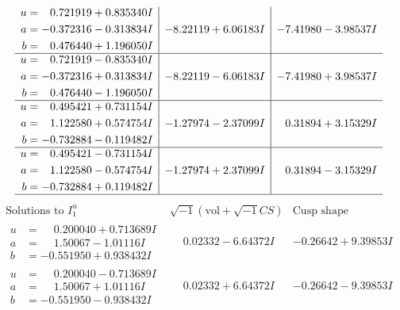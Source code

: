 \documentclass[1p]{elsarticle_modified}
\theoremstyle{definition}
\newcommand{\I}{\sqrt{-1}}
\begin{document}
$$\begin{array}{c|c|c}
\begin{aligned}
u &= \phantom{-}0.721919 + 0.835340 I \\
a &= -0.372316 - 0.313834 I \\
b &= \phantom{-}0.476440 + 1.196050 I\end{aligned}
 & -8.22119 + 6.06183 I & -7.41980 - 3.98537 I \\ \hline\begin{aligned}
u &= \phantom{-}0.721919 - 0.835340 I \\
a &= -0.372316 + 0.313834 I \\
b &= \phantom{-}0.476440 - 1.196050 I\end{aligned}
 & -8.22119 - 6.06183 I & -7.41980 + 3.98537 I \\ \hline\begin{aligned}
u &= \phantom{-}0.495421 + 0.731154 I \\
a &= \phantom{-}1.122580 + 0.574754 I \\
b &= -0.732884 - 0.119482 I\end{aligned}
 & -1.27974 - 2.37099 I & \phantom{-}0.31894 + 3.15329 I \\ \hline\begin{aligned}
u &= \phantom{-}0.495421 - 0.731154 I \\
a &= \phantom{-}1.122580 - 0.574754 I \\
b &= -0.732884 + 0.119482 I\end{aligned}
 & -1.27974 + 2.37099 I & \phantom{-}0.31894 - 3.15329 I\\
 \hline 
 \end{array}$$\newpage$$\begin{array}{c|c|c}  
\text{Solutions to }I^u_{1}& \I (\text{vol} + \sqrt{-1}CS) & \text{Cusp shape}\\
 \hline 
\begin{aligned}
u &= \phantom{-}0.200040 + 0.713689 I \\
a &= \phantom{-}1.50067 - 1.01116 I \\
b &= -0.551950 + 0.938432 I\end{aligned}
 & \phantom{-}0.02332 - 6.64372 I & -0.26642 + 9.39853 I \\ \hline\begin{aligned}
u &= \phantom{-}0.200040 - 0.713689 I \\
a &= \phantom{-}1.50067 + 1.01116 I \\
b &= -0.551950 - 0.938432 I\end{aligned}
 & \phantom{-}0.02332 + 6.64372 I & -0.26642 - 9.39853 I \\ \hline\begin{aligned}

\end{aligned}
\end{array}$$
\end{document}
